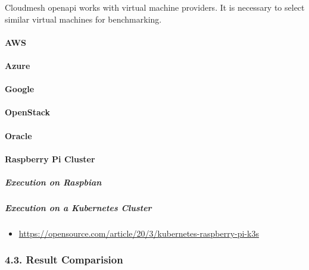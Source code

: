 Cloudmesh openapi works with virtual machine providers. It is necessary
to select similar virtual machines for benchmarking.

\hypertarget{aws}{%
\paragraph{AWS}\label{aws}}

\hypertarget{azure}{%
\paragraph{Azure}\label{azure}}

\hypertarget{google}{%
\paragraph{Google}\label{google}}

\hypertarget{openstack}{%
\paragraph{OpenStack}\label{openstack}}

\hypertarget{oracle}{%
\paragraph{Oracle}\label{oracle}}

\hypertarget{raspberry-pi-cluster}{%
\paragraph{Raspberry Pi Cluster}\label{raspberry-pi-cluster}}

\hypertarget{execution-on-raspbian}{%
\subparagraph{Execution on Raspbian}\label{execution-on-raspbian}}

\hypertarget{execution-on-a-kubernetes-cluster}{%
\subparagraph{Execution on a Kubernetes
Cluster}\label{execution-on-a-kubernetes-cluster}}

\begin{itemize}
\tightlist
\item
  \url{https://opensource.com/article/20/3/kubernetes-raspberry-pi-k3s}
\end{itemize}

\hypertarget{result-comparision}{%
\subsubsection{4.3. Result Comparision}\label{result-comparision}}

